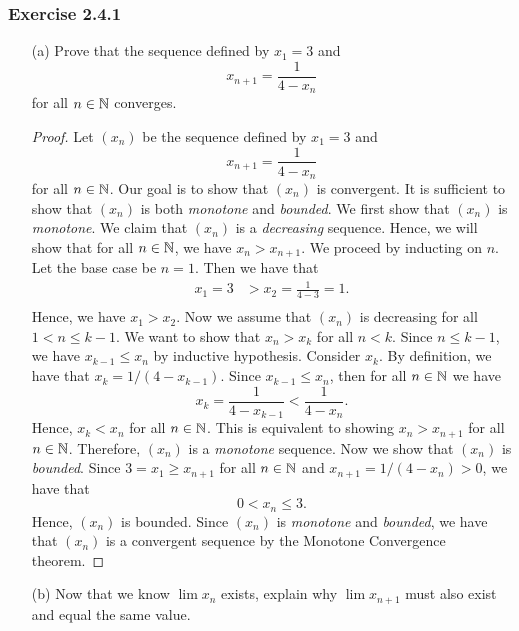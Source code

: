 \subsubsection{Exercise 2.4.1}
\begin{enumerate}
    \item[(a)] Prove that the sequence defined by \( x_1 = 3\) and 
        \[ x_{n+1} = \frac{1}{4 - x_n}\]
        for all \( n \in \mathbb{N} \) converges.
        \begin{proof}
            Let \( (x_n)\) be the sequence defined by \( x_1 = 3\) and 
            \[ x_{n+1} = \frac{1}{4-x_n}\]
            for all \( n \in \mathbb{N}\). Our goal is to show that \( (x_n)\) is convergent. It is sufficient to show that \( (x_n)\) is both \textit{monotone} and \textit{bounded}. We first show that \( (x_n)\) is \textit{monotone}. We claim that \( (x_n)\) is a \textit{decreasing} sequence. Hence, we will show that for all \( n \in \mathbb{N} \), we have \( x_n > x_{n+1}\). We proceed by inducting on \( n \). Let the base case be \( n = 1 \). Then we have that 
            \begin{align*}
                x_1 = 3 &> x_2 = \frac{1}{4 - 3} = 1. \\ 
            \end{align*}
            Hence, we have \( x_1 > x_2 \). Now we assume that \( (x_n)\) is decreasing for all \( 1 < n \leq k-1 \). We want to show that \( x_n > x_k \) for all \( n < k \). Since \( n \leq k - 1\), we have \( x_{k-1} \leq x_n \) by inductive hypothesis. Consider \( x_k \). By definition, we have that \( x_k = 1 /(4 - x_{k-1})\). Since \( x_{k-1} \leq x_n \), then for all \( n \in \mathbb{N} \) we have 
            \[
                x_k = \frac{1}{4 - x_{k-1}} < \frac{1}{4-x_n}.
            \]
            Hence, \( x_k < x_n \) for all \( n \in \mathbb{N} \). This is equivalent to showing \( x_n > x_{n+1}\) for all \( n \in \mathbb{N} \). Therefore, \( (x_n)\) is a \textit{monotone} sequence. 
            Now we show that \( (x_n)\) is \textit{bounded}. Since \( 3 = x_1 \geq x_{n+1}\) for all \( n \in \mathbb{N} \) and \( x_{n+1} = 1 / (4 - x_n) > 0 \), we have that 
            \[ 0 < x_n \leq 3.\]
            Hence, \( (x_n)\) is bounded. Since \( (x_n)\) is \textit{monotone} and \textit{bounded}, we have that 
            \( (x_n)\) is a convergent sequence by the Monotone Convergence theorem. 
        \end{proof}
    \item[(b)] Now that we know \( \lim x_n \) exists, explain why \( \lim x_{n+1}\) must also exist and equal the same value.

\end{enumerate}
